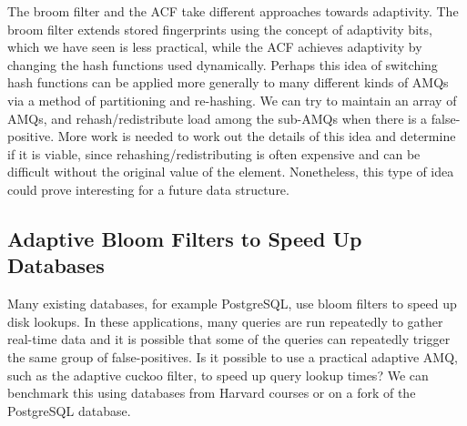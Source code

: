 \documentclass[../paper.tex]{subfiles}
\begin{document}
The broom filter and the ACF take different approaches towards adaptivity. The broom filter extends
stored fingerprints using the concept of adaptivity bits, which we have seen is less practical, while
the ACF achieves adaptivity by changing the hash functions used dynamically. Perhaps this idea of
switching hash functions can be applied more generally to many different kinds of AMQs via a method
of partitioning and re-hashing. We can try to maintain an array of AMQs, and rehash/redistribute load
among the sub-AMQs when there is a false-positive. More work is needed to work out the details of this
idea and determine if it is viable, since rehashing/redistributing is often expensive and can be
difficult without the original value of the element. Nonetheless, this type of idea could prove
interesting for a future data structure.


\subsection{Adaptive Bloom Filters to Speed Up Databases}
Many existing databases, for example PostgreSQL, use bloom filters to speed up disk lookups. In these
applications, many queries are run repeatedly to gather real-time data and it is possible that
some of the queries can repeatedly trigger the same group of false-positives. Is it possible to use
a practical adaptive AMQ, such as the adaptive cuckoo filter, to speed up query lookup times? We can
benchmark this using databases from Harvard courses or on a fork of the PostgreSQL database.
\end{document}
